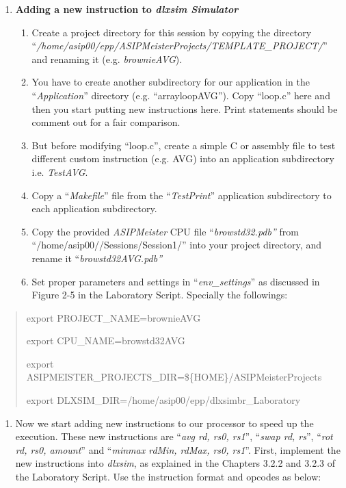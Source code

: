 \documentclass[
]{article}
\begin{document}
\begin{enumerate}
\def\labelenumi{\arabic{enumi}.}
\setcounter{enumi}{2}
\item
  \textbf{Adding a new instruction to \emph{dlxsim Simulator}}

  \begin{enumerate}
  \def\labelenumii{\arabic{enumii}.}
  \item
    Create a project directory for this session by copying the directory
    ``\emph{/home/asip00/­epp/ASIP­Meister­Projects/TEMPLATE\_PROJECT/}''
    and renaming it (e.g. \emph{brownieAVG}).
  \item
    You have to create another subdirectory for our application in the
    ``\emph{Application}'' directory (e.g. ``arrayloopAVG''). Copy
    ``loop.c'' here and then you start putting new instructions here.
    Print statements should be comment out for a fair comparison.
  \item
    But before modifying ``loop.c'', create a simple C or assembly file
    to test different custom instruction (e.g. AVG) into an application
    subdirectory i.e. \emph{TestAVG}.
  \item
    Copy a ``\emph{Makefile}'' file from the ``\emph{TestPrint}''
    application subdirectory to each application subdirectory.
  \item
    Copy the provided \emph{ASIPMeister} CPU file
    ``\emph{browstd32.pdb''} from ``/home/asip00//Sessions/Session1/''
    into your project directory, and rename it
    ``\emph{browstd32AVG.pdb''}
  \item
    Set proper parameters and settings in ``\emph{env\_settings}'' as
    discussed in Figure 2-5 in the Laboratory Script. Specially the
    followings:
  \end{enumerate}
\end{enumerate}

\begin{quote}
export PROJECT\_NAME=brownieAVG

export CPU\_NAME=browstd32AVG

export ASIPMEISTER\_PROJECTS\_DIR=\$\{HOME\}/ASIPMeisterProjects

export DLXSIM\_DIR=/home/asip00/epp/dlxsimbr\_Laboratory
\end{quote}

\begin{enumerate}
\def\labelenumi{\arabic{enumi}.}
\setcounter{enumi}{6}
\item
  Now we start adding new instructions to our processor to speed up the
  execution. These new instructions are ``\emph{avg rd, rs0, rs1}'',
  ``\emph{swap rd, rs}'', ``\emph{rot rd, rs0, amount}'' and
  ``\emph{minmax rdMin, rdMax, rs0, rs1}''. First, implement the new
  instructions into \emph{dlxsim}, as explained in the Chapters 3.2.2
  and 3.2.3 of the Laboratory Script. Use the instruction format and
  opcodes as below:
\end{enumerate}
\end{document}
